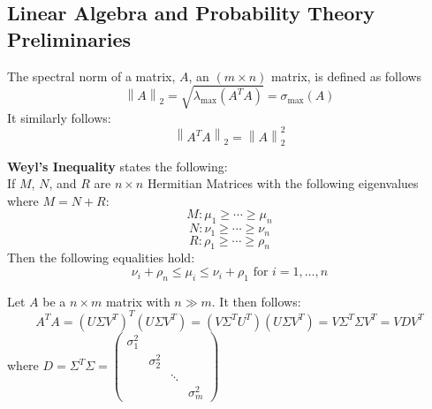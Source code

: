 \documentclass{article} %
\newcommand{\norm}[1]{\left\lVert#1\right\rVert}
\begin{document}
	\begin{appendices}
		
	\newpage
	\appendix
	\startcontents[sections]
	\newpage
	
	
	\section{Linear Algebra and Probability Theory Preliminaries}
	
	\begin{fact} The spectral norm of a matrix, $A$, an $(m \times n)$ matrix, is defined as follows
		\begin{equation}
			\norm{A}_2 = \sqrt{\lambda_{\max}\left(A^T A\right)} = \sigma_{\max}(A)
		\end{equation}
		It similarly follows:
		\begin{equation}
			\norm{A^T A}_2 = \norm{A}^2_2
		\end{equation}
	\end{fact}

	\begin{fact}
		\textbf{Weyl's Inequality} states the following:\\ If $M$, $N$, and $R$ are $n \times n$ Hermitian Matrices with the following eigenvalues where $M = N + R$:
		\begin{equation*}
			M: \mu_1 \geq \cdots \geq \mu_n
		\end{equation*}
		\begin{equation*}
			N: \nu_1 \geq \cdots \geq \nu_n
		\end{equation*}
		\begin{equation*}
			R: \rho_1 \geq \cdots \geq \rho_n
		\end{equation*}
		Then the following equalities hold:
		\begin{equation*}
			\nu_i + \rho_n \leq \mu_i \leq \nu_i + \rho_1 \text { for } i = 1,\dots,n
		\end{equation*}
	\end{fact}

	\begin{fact}
		Let $A$ be a $n \times m$ matrix with $n \gg m$. It then follows:
		\begin{equation}
			A^T A = \left(U \Sigma V^T\right)^T \left(U \Sigma V^T \right) = \left(V\Sigma^T U^T\right)\left(U \Sigma V^T\right) = V \Sigma^T \Sigma V^T = V D V^T
		\end{equation}
		where $D = \Sigma^T \Sigma = \begin{pmatrix} \sigma_1^2 & & & \\ & \sigma_2^2 & & \\ & & \ddots & \\ & & & \sigma_m^2 \end{pmatrix}$
	\end{fact}


\end{appendices}
\end{document}
